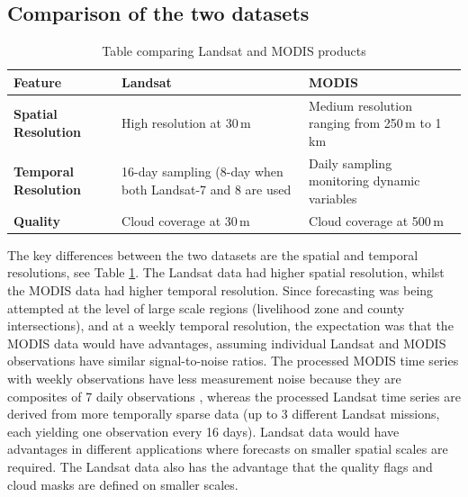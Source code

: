 \documentclass[review]{elsarticle}
\begin{document}
\subsection{Comparison of the two datasets} 

\begin{table}[!hb]
	\small
	\caption{Table comparing Landsat and MODIS products}\label{tab:sm1}
	\label{tab:comp}
	\centering
	\begin{tabular}{p{2cm}p{4cm}p{4cm}}
		\toprule
		\textbf{Feature}	& \textbf{Landsat} & \textbf{MODIS}\\
		\midrule
		\textbf{Spatial \newline Resolution} & 	High resolution at 30\,m 	&   Medium resolution ranging from 250\,m to 1\,km \\
		\textbf{Temporal \newline Resolution}	&  16-day sampling (8-day when both Landsat-7 and 8 are used	&   Daily sampling  monitoring dynamic variables  \\ 
		\textbf{Quality} &Cloud coverage at 30\,m & Cloud coverage at 500\,m \\
		
		\bottomrule
	\end{tabular}
\end{table}

The key differences between the two datasets are the spatial and temporal resolutions, see Table \ref{tab:comp}. The Landsat data had higher spatial resolution, whilst the MODIS data had higher temporal resolution. Since forecasting was being attempted at the level of large scale regions (livelihood zone and county intersections), and at a weekly temporal resolution, the expectation was that the MODIS data would have advantages,  assuming individual Landsat and MODIS observations have similar signal-to-noise ratios. The processed MODIS time series with weekly observations have less measurement noise because they are composites of 7 daily observations , whereas the processed Landsat time series are derived from more temporally sparse data (up to 3 different Landsat missions, each yielding one observation every 16 days). Landsat data would have advantages in different applications where forecasts on smaller spatial scales are required. The Landsat data also has the advantage that the quality flags and cloud masks are defined on smaller scales.    
\end{document}
